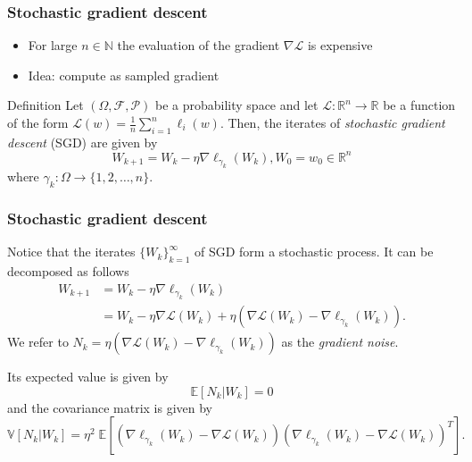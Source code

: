 \documentclass[17pt,institute=e10]{tuhh_presentation}
\newcommand{\R}{\mathbb{R}}
\newcommand{\Lo}{\mathcal{L} : \R^n \rightarrow \R}
\newcommand{\CL}{\mathcal{L}}
\newcommand{\E}[1]{\mathbb{E}\left[{#1} \right]}
\newcommand{\V}[1]{\mathbb{V}\left[{#1} \right]}
\begin{document}
\begin{frame}[fragile]
  \frametitle{Stochastic gradient descent}
  \begin{itemize}
    \item For large $n \in \mathbb{N}$ the evaluation of the gradient $\nabla \CL$ is expensive
    \item Idea: compute as sampled gradient
  \end{itemize}
  \begin{block}{Definition}
    Let $(\Omega, \mathcal{F}, \mathcal{P})$ be a probability space and let $\Lo$ be a function of the form $\CL (w) = \frac{1}{n} \sum_{i=1}^n \ell_i(w)$.
    Then, the iterates of \textcolor{purple-pontifex}{\emph{stochastic gradient descent}} (SGD) are given by
    \begin{equation*}
      W_{k+1} = W_k - \eta \nabla \ell_{\gamma_k} (W_k), W_0 = w_0 \in \mathbb{R}^n
    \end{equation*}
    where $\gamma_k : \Omega \rightarrow \{1,2,\dots,n\}$. 
  \end{block}
  
\end{frame}

\begin{frame}[fragile]
  \frametitle{Stochastic gradient descent}
  Notice that the iterates $\{W_k\}_{k=1}^\infty$ of SGD form a stochastic process.
  It can be decomposed as follows
  \begin{align*}
    W_{k+1} &= W_k - \eta \nabla \ell_{\gamma_k} (W_k) \\
    &= W_k - \eta \nabla \CL(W_k) + \eta \left(\nabla \CL(W_k) - \nabla \ell_{\gamma_k} (W_k) \right).
  \end{align*}
  We refer to $N_k = \eta \left(\nabla \CL(W_k) - \nabla \ell_{\gamma_k} (W_k) \right)$ as the \emph{\textcolor{purple-pontifex}{gradient noise}}.

  Its expected value is given by
  \begin{equation*}
    \E{N_k|W_k} = 0
  \end{equation*}
  and the \textcolor{purple-pontifex}{covariance matrix} is given by
  \begin{equation*}
    \V{N_k|W_k} = \eta^2 \; \E{\left(\nabla \ell_{\gamma_k}(W_k) - \nabla \CL(W_k)\right)\left(\nabla \ell_{\gamma_k}(W_k) - \nabla \CL(W_k)\right)^T}.
  \end{equation*}
  
\end{frame}
\end{document}
